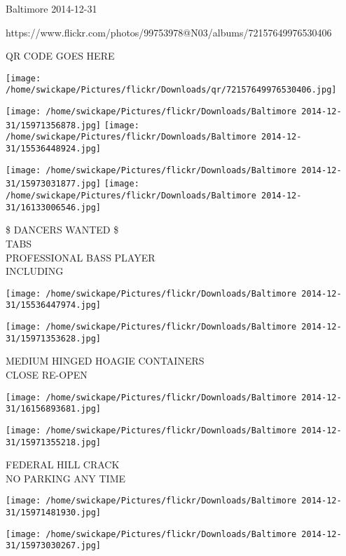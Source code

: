 \documentclass[10pt,letterpaper]{article}
\begin{document}
Baltimore 2014-12-31

https://www.flickr.com/photos/99753978@N03/albums/72157649976530406

QR CODE GOES HERE

\texttt{[image: /home/swickape/Pictures/flickr/Downloads/qr/72157649976530406.jpg]}
\pagebreak

\texttt{[image: /home/swickape/Pictures/flickr/Downloads/Baltimore 2014-12-31/15971356878.jpg]}
\texttt{[image: /home/swickape/Pictures/flickr/Downloads/Baltimore 2014-12-31/15536448924.jpg]}

\texttt{[image: /home/swickape/Pictures/flickr/Downloads/Baltimore 2014-12-31/15973031877.jpg]}
\texttt{[image: /home/swickape/Pictures/flickr/Downloads/Baltimore 2014-12-31/16133006546.jpg]}

\$ DANCERS WANTED \$\\
TABS\\
PROFESSIONAL BASS PLAYER\\
INCLUDING\\
\pagebreak

\texttt{[image: /home/swickape/Pictures/flickr/Downloads/Baltimore 2014-12-31/15536447974.jpg]}

\vspace{0.25in}
\texttt{[image: /home/swickape/Pictures/flickr/Downloads/Baltimore 2014-12-31/15971353628.jpg]}

MEDIUM HINGED HOAGIE CONTAINERS\\
CLOSE RE{-}OPEN\\
\pagebreak

\texttt{[image: /home/swickape/Pictures/flickr/Downloads/Baltimore 2014-12-31/16156893681.jpg]}

\vspace{0.25in}
\texttt{[image: /home/swickape/Pictures/flickr/Downloads/Baltimore 2014-12-31/15971355218.jpg]}

FEDERAL HILL CRACK\\
NO PARKING ANY TIME\\
\pagebreak

\texttt{[image: /home/swickape/Pictures/flickr/Downloads/Baltimore 2014-12-31/15971481930.jpg]}

\vspace{0.25in}
\texttt{[image: /home/swickape/Pictures/flickr/Downloads/Baltimore 2014-12-31/15973030267.jpg]}
\end{document}

